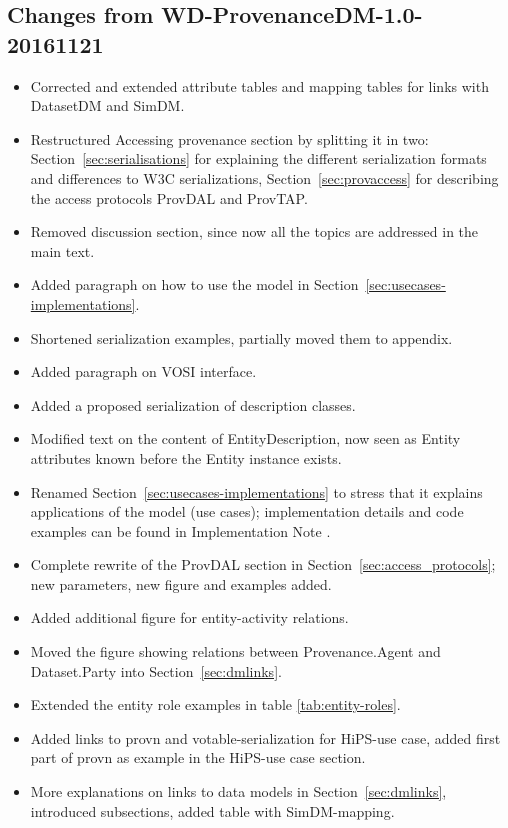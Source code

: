 \documentclass[11pt,a4paper]{ivoa}
\begin{document}
\begin{appendices}
\subsection{Changes from WD-ProvenanceDM-1.0-20161121}
\begin{itemize}
\item Corrected and extended attribute tables and mapping tables for links with DatasetDM and SimDM.
\item Restructured Accessing provenance section by splitting it in two: Section~\ref{sec:serialisations} for explaining the different serialization formats and differences to W3C serializations, Section~\ref{sec:provaccess} for describing the access protocols ProvDAL and ProvTAP.
\item Removed discussion section, since now all the topics are addressed in the main text.
\item Added paragraph on how to use the model in Section~\ref{sec:usecases-implementations}.
\item Shortened serialization examples, partially moved them to appendix.
\item Added paragraph on VOSI interface.
\item Added a proposed serialization of description classes.
\item Modified text on the content of EntityDescription, now seen as Entity attributes known before the Entity instance exists.
\item Renamed Section~\ref{sec:usecases-implementations} to stress that it explains applications of the model (use cases); implementation details and code examples can be found in Implementation Note \citep{std:ProvenanceImplementationNote}.
\item Complete rewrite of the ProvDAL section in Section~\ref{sec:access_protocols}; new parameters, new figure and examples added.
\item Added additional figure for entity-activity relations.
\item Moved the figure showing relations between Provenance.Agent and Dataset.Party into Section~\ref{sec:dmlinks}.
\item Extended the entity role examples in table \ref{tab:entity-roles}.
\item Added links to provn and votable-serialization for HiPS-use case, added first part of provn as example in the HiPS-use case section.
\item More explanations on links to data models in Section~\ref{sec:dmlinks}, introduced subsections, added table with SimDM-mapping.

\end{itemize}
\end{appendices}
\end{document}
